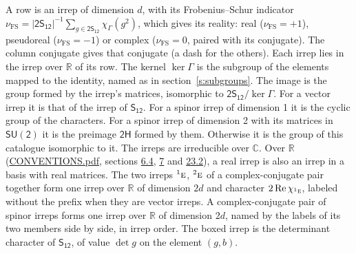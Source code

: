 \documentclass[10pt,a4paper]{article}
\numberwithin{equation}{section}
\newcommand{\grp}[1]{\mathsf{#1}}
\newcommand{\irr}[1]{\text{\normalfont\scshape #1}}
\newcommand{\conjpair}[1]{{}^{#1}}
\newcommand{\irchar}[1]{\chi_{#1}}
\newcommand{\fsind}{\nu_{\mathrm{FS}}}
\begin{document}
\leavevmode\label{n:index.frobenius}\label{n:head.irrep}\label{n:head.reality}A row is an irrep of dimension $d$, with its Frobenius--Schur indicator $\fsind = |\grp{2S_{12}}|^{-1}\allowbreak\sum_{g\in\grp{2S_{12}}}\irchar{\Gamma}(g^2)$, which gives its reality: real ($\fsind = +1$), pseudoreal ($\fsind = -1$) or complex ($\fsind = 0$, paired with its conjugate). \label{n:head.conjugate}The column conjugate gives that conjugate (a dash for the others). \label{n:head.over.real}Each irrep lies in the irrep over $\mathbb{R}$ of its row. \label{n:head.kernel}The kernel $\ker\Gamma$ is the subgroup of the elements mapped to the identity, named as in section~\ref{s:subgroups}. \label{n:head.image}The image is the group formed by the irrep's matrices, isomorphic to $\grp{2S_{12}}/\ker\Gamma$. For a vector irrep it is that of the irrep of \href{../../../rotation/data/pdf/S12.pdf}{$\grp{S_{12}}$}. For a spinor irrep of dimension 1 it is the cyclic group of the characters. For a spinor irrep of dimension 2 with its matrices in $\grp{SU(2)}$ it is the preimage $\grp{2H}$ formed by them. Otherwise it is the group of this catalogue isomorphic to it. The irreps are irreducible over $\mathbb{C}$. Over $\mathbb{R}$ (\href{../../CONVENTIONS.pdf}{CONVENTIONS.pdf}, sections \href{../../../rotation/CONVENTIONS.pdf\#conv.6.4}{6.4}, \href{../../../rotation/CONVENTIONS.pdf\#conv.7}{7} and \href{../../CONVENTIONS.pdf\#conv.23.2}{23.2}), a real irrep is also an irrep in a basis with real matrices. The two irreps $\conjpair{1}\irr{e}$, $\conjpair{2}\irr{e}$ of a complex-conjugate pair together form one irrep over $\mathbb{R}$ of dimension $2d$ and character $2\operatorname{Re}\irchar{\conjpair{1}\irr{e}}$, labeled without the prefix when they are vector irreps. A complex-conjugate pair of spinor irreps forms one irrep over $\mathbb{R}$ of dimension $2d$, named by the labels of its two members side by side, in irrep order. \label{n:mark.determinant}The boxed irrep is the determinant character of \href{../../../rotation/data/pdf/S12.pdf}{$\grp{S_{12}}$}, of value $\det g$ on the element $(g, b)$.
\setlength{\emergencystretch}{2em}\par\setlength{\emergencystretch}{0pt}
\end{document}
